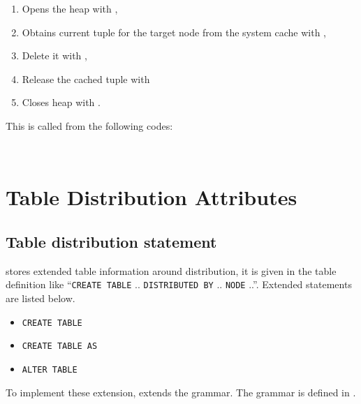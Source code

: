 	\begin{enumerate}
		\item Opens the heap with ,
		\item Obtains current tuple for the target node from the system cache with ,
		\item Delete it with ,
		\item Release the cached tuple with 
		\item Closes heap with .
	\end{enumerate}
    
    This is called from the following codes:
    
    \FuncRefHdr
  	  \\
  	  \hline
    \FuncRefTrailor



\section{\label{sec:extraTableAttr}Table Distribution Attributes}



\subsection{Table distribution statement}

  \XC{} stores extended table information around distribution, it is given in the table definition
  like ``\texttt{CREATE TABLE} .. \texttt{DISTRIBUTED BY} .. \texttt{NODE} ..''.
  Extended statements are listed below.
  
  \begin{itemize}
	  \item \texttt{CREATE TABLE}
	  \item \texttt{CREATE TABLE AS}
	  \item \texttt{ALTER TABLE}
  \end{itemize}
  
  To implement these extension, \XC{} extends the grammar.
  The grammar is defined in .
  
